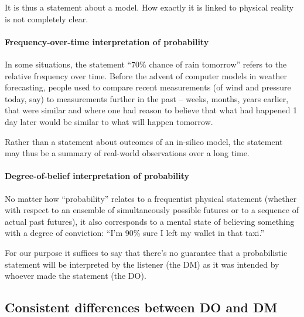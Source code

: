 \documentclass[a4paper, 12pt]{article}
\newcommand{\seclabel}[1]{\label{sec:#1}}
\begin{document}
It is thus a statement about a model. How exactly it is linked to physical reality is not completely clear. 


\paragraph{Frequency-over-time interpretation of probability}
In some situations, the statement ``70\% chance of rain tomorrow'' refers to the relative frequency over time. Before the advent of computer models in weather forecasting, people used to compare recent measurements (of wind and pressure today, say) to measurements further in the past -- weeks, months, years earlier, that were similar and where one had reason to believe that what had happened 1 day later would be similar to what will happen tomorrow.

Rather than a statement about outcomes of an in-silico model, the statement may thus be a summary of real-world observations over a long time.

\paragraph{Degree-of-belief interpretation of probability}
No matter how ``probability'' relates to a frequentist physical statement (whether with respect to an ensemble of simultaneously possible futures or to a sequence of actual past futures), it also corresponds to a mental state of believing something with a degree of conviction: ``I'm 90\% sure I left my wallet in that taxi.''

For our purpose it suffices to say that there's no guarantee that a probabilistic statement will be interpreted by the listener (the DM) as it was intended by whoever made the statement (the DO).

\subsection{Consistent differences between DO and DM \seclabel{condition2}}
\end{document}
